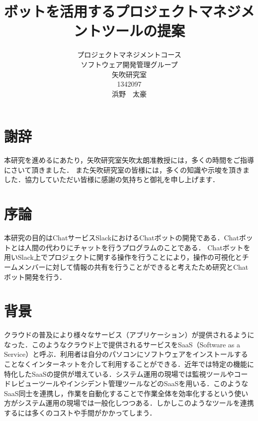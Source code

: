 \title{ボットを活用するプロジェクトマネジメントツールの提案}
\author{プロジェクトマネジメントコース\\
ソフトウェア開発管理グループ\\
矢吹研究室\\
1342097\\
浜野　太豪}
\date{}

\maketitle



\chapter*{謝辞}

本研究を進めるにあたり，矢吹研究室矢吹太朗准教授には，多くの時間をご指導にさいて頂きました．
また矢吹研究室の皆様には，多くの知識や示唆を頂きました．協力していただい皆様に感謝の気持ちと御礼を申し上げます．

\tableofcontents%


\chapter{序論}
本研究の目的はChatサービスSlackにおけるChatボットの開発である．Chatボットとは人間の代わりにチャットを行うプログラムのことである．
Chatボットを用いSlack上でプロジェクトに関する操作を行うことにより，操作の可視化とチームメンバーに対して情報の共有を行うことができると考えたため研究とChatボット開発を行う．

\chapter{背景}
クラウドの普及により様々なサービス（アプリケーション）が提供されるようになった．このようなクラウド上で提供されるサービスをSaaS（Software as a Service）と呼ぶ．利用者は自分のパソコンにソフトウェアをインストールすることなくインターネットを介して利用することができる\cite{saas}．近年では特定の機能に特化したSaaSの提供が増えている．システム運用の現場では監視ツールやコードレビューツールやインシデント管理ツールなどのSaaSを用いる．このようなSaaS同士を連携し，作業を自動化することで作業全体を効率化するという使い方がシステム運用の現場では一般化しつつある．しかしこのようなツールを連携するには多くのコストや手間がかかってしまう．

